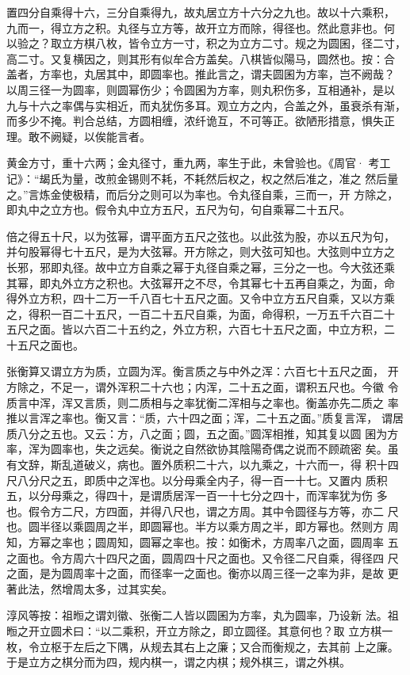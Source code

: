\documentclass[12pt,UTF8]{ctexbook}
\begin{document}
置四分自乘得十六，三分自乘得九，故丸居立方十六分之九也。故以十六乘积， 九而一，得立方之积。丸径与立方等，故开立方而除，得径也。然此意非也。何 以验之？取立方棋八枚，皆令立方一寸，积之为立方二寸。规之为圆囷，径二寸， 高二寸。又复横因之，则其形有似牟合方盖矣。八棋皆似陽马，圆然也。按：合 盖者，方率也，丸居其中，即圆率也。推此言之，谓夫圆囷为方率，岂不阙哉？ 以周三径一为圆率，则圆幂伤少；令圆囷为方率，则丸积伤多，互相通补，是以 九与十六之率偶与实相近，而丸犹伤多耳。观立方之内，合盖之外，虽衰杀有渐， 而多少不掩。判合总结，方圆相缠，浓纤诡互，不可等正。欲陋形措意，惧失正 理。敢不阙疑，以俟能言者。

黄金方寸，重十六两；金丸径寸，重九两，率生于此，未曾验也。《周官· 考工记》：“朅氏为量，改煎金锡则不耗，不耗然后权之，权之然后准之，准之 然后量之。”言炼金使极精，而后分之则可以为率也。令丸径自乘，三而一，开 方除之，即丸中之立方也。假令丸中立方五尺，五尺为句，句自乘幂二十五尺。

倍之得五十尺，以为弦幂，谓平面方五尺之弦也。以此弦为股，亦以五尺为句， 并句股幂得七十五尺，是为大弦幂。开方除之，则大弦可知也。大弦则中立方之 长邪，邪即丸径。故中立方自乘之幂于丸径自乘之幂，三分之一也。今大弦还乘 其幂，即丸外立方之积也。大弦幂开之不尽，令其幂七十五再自乘之，为面，命 得外立方积，四十二万一千八百七十五尺之面。又令中立方五尺自乘，又以方乘 之，得积一百二十五尺，一百二十五尺自乘，为面，命得积，一万五千六百二十 五尺之面。皆以六百二十五约之，外立方积，六百七十五尺之面，中立方积，二 十五尺之面也。

张衡算又谓立方为质，立圆为浑。衡言质之与中外之浑：六百七十五尺之面， 开方除之，不足一，谓外浑积二十六也；内浑，二十五之面，谓积五尺也。今徽 令质言中浑，浑又言质，则二质相与之率犹衡二浑相与之率也。衡盖亦先二质之 率推以言浑之率也。衡又言：“质，六十四之面；浑，二十五之面。”质复言浑， 谓居质八分之五也。又云：方，八之面；圆，五之面。”圆浑相推，知其复以圆 囷为方率，浑为圆率也，失之远矣。衡说之自然欲协其陰陽奇偶之说而不顾疏密 矣。虽有文辞，斯乱道破义，病也。置外质积二十六，以九乘之，十六而一，得 积十四尺八分尺之五，即质中之浑也。以分母乘全内子，得一百一十七。又置内 质积五，以分母乘之，得四十，是谓质居浑一百一十七分之四十，而浑率犹为伤 多也。假令方二尺，方四面，并得八尺也，谓之方周。其中令圆径与方等，亦二 尺也。圆半径以乘圆周之半，即圆幂也。半方以乘方周之半，即方幂也。然则方 周知，方幂之率也；圆周知，圆幂之率也。按：如衡术，方周率八之面，圆周率 五之面也。令方周六十四尺之面，圆周四十尺之面也。又令径二尺自乘，得径四 尺之面，是为圆周率十之面，而径率一之面也。衡亦以周三径一之率为非，是故 更著此法，然增周太多，过其实矣。

淳风等按：祖暅之谓刘徽、张衡二人皆以圆囷为方率，丸为圆率，乃设新 法。祖暅之开立圆术曰：“以二乘积，开立方除之，即立圆径。其意何也？取 立方棋一枚，令立枢于左后之下隅，从规去其右上之廉；又合而衡规之，去其前 上之廉。于是立方之棋分而为四，规内棋一，谓之内棋；规外棋三，谓之外棋。
\end{document}
